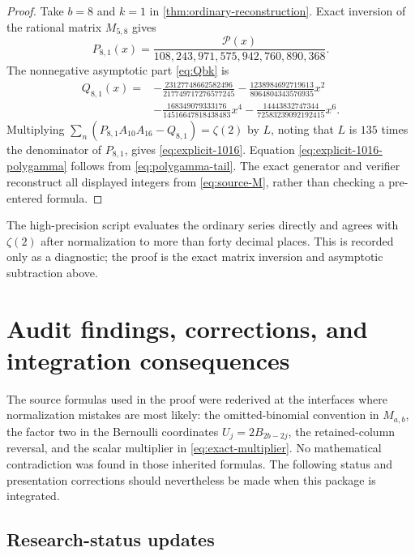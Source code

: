 \documentclass[11pt]{article}
\theoremstyle{definition}
\begin{document}
\begin{proof}
Take $b=8$ and $k=1$ in
\cref{thm:ordinary-reconstruction}.  Exact inversion of the rational
matrix $M_{5,8}$ gives
\[
 P_{8,1}(x)=\frac{\mathscr P(x)}
 {108{,}243{,}971{,}575{,}942{,}760{,}890{,}368}.
\]
The nonnegative asymptotic part \eqref{eq:Qbk} is
\begin{align*}
 Q_{8,1}(x)={}&-\frac{23127748662582496}{217749717276577245}
 -\frac{1238984692719613}{8064804343576935}x^2\\
 &-\frac{168349079333176}{14516647818438483}x^4
 -\frac{14443832747344}{72583239092192415}x^6.
\end{align*}
Multiplying
$\sum_n(P_{8,1}A_{10}A_{16}-Q_{8,1})=\zeta(2)$ by $L$, noting that
$L$ is $135$ times the denominator of $P_{8,1}$, gives
\eqref{eq:explicit-1016}.  Equation
\eqref{eq:explicit-1016-polygamma} follows from
\eqref{eq:polygamma-tail}.  The exact generator and verifier reconstruct
all displayed integers from \eqref{eq:source-M}, rather than checking a
pre-entered formula.
\end{proof}

The high-precision script evaluates the ordinary series directly and
agrees with $\zeta(2)$ after normalization to more than forty decimal
places.  This is recorded only as a diagnostic; the proof is the exact
matrix inversion and asymptotic subtraction above.
 \section{Audit findings, corrections, and integration consequences}
\label{sec:audit}

The source formulas used in the proof were rederived at the interfaces
where normalization mistakes are most likely: the omitted-binomial
convention in $M_{a,b}$, the factor two in the Bernoulli coordinates
$U_j=2B_{2b-2j}$, the retained-column reversal, and the scalar
multiplier in \eqref{eq:exact-multiplier}.  No mathematical
contradiction was found in those inherited formulas.  The following
status and presentation corrections should nevertheless be made when
this package is integrated.

\subsection{Research-status updates}
\end{document}
